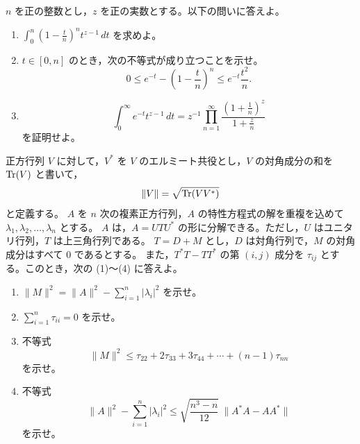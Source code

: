 
\(n\) を正の整数とし，\(z\) を正の実数とする。以下の問いに答えよ。

\begin{enumerate}
  \item \(\displaystyle \int_0^n \left(1-\frac{t}{n}\right)^n t^{z-1}\,dt\) を求めよ。
  \item \(t\in[0,n]\) のとき，次の不等式が成り立つことを示せ。
  \[
    0\le e^{-t}-\left(1-\frac{t}{n}\right)^n
      \le e^{-t}\frac{t^2}{n}.
  \]
  \item
  \[
    \int_0^\infty e^{-t}t^{z-1}\,dt
      =z^{-1}\prod_{n=1}^{\infty}\frac{\left(1+\frac1n\right)^z}{1+\frac{z}{n}}
  \]
  を証明せよ。
\end{enumerate}


正方行列 \(V\) に対して，\(V^*\) を \(V\) のエルミート共役とし，\(V\) の対角成分の和を
\(\operatorname{Tr}(V)\) と書いて，
\[
  \|V\|=\sqrt{\operatorname{Tr}(VV^*)}
\]
と定義する。
\(A\) を \(n\) 次の複素正方行列，\(A\) の特性方程式の解を重複を込めて
\(\lambda_1,\lambda_2,\ldots,\lambda_n\) とする。
\(A\) は，\(A=UTU^*\) の形に分解できる。ただし，\(U\) はユニタリ行列，\(T\) は上三角行列である。
\(T=D+M\) とし，\(D\) は対角行列で，\(M\) の対角成分はすべて \(0\) であるとする。
また，\(T^*T-TT^*\) の第 \((i,j)\) 成分を \(\tau_{ij}\) とする。このとき，次の (1)〜(4) に答えよ。

\begin{enumerate}
  \item \(\displaystyle \|M\|^2=\|A\|^2-\sum_{i=1}^{n}|\lambda_i|^2\) を示せ。
  \item \(\displaystyle \sum_{i=1}^{n}\tau_{ii}=0\) を示せ。
  \item 不等式
  \[
    \|M\|^2\le \tau_{22}+2\tau_{33}+3\tau_{44}+\cdots+(n-1)\tau_{nn}
  \]
  を示せ。
  \item 不等式
  \[
    \|A\|^2-\sum_{i=1}^{n}|\lambda_i|^2
      \le \sqrt{\frac{n^3-n}{12}}\ \|A^*A-AA^*\|
  \]
  を示せ。
\end{enumerate}


